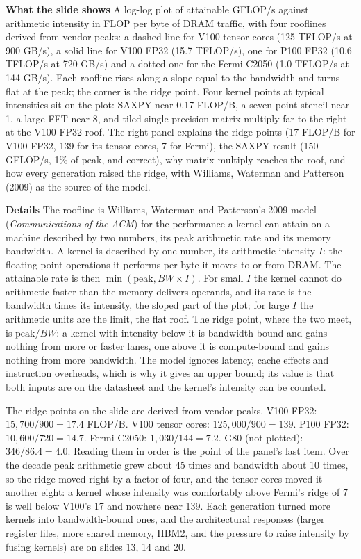 \documentclass[11pt,letterpaper]{article}
\newcommand{\para}[1]{\medskip\noindent\textbf{#1}\quad}
\begin{document}
\para{What the slide shows} A log-log plot of attainable GFLOP/s against arithmetic intensity in FLOP per byte of DRAM traffic, with four rooflines derived from vendor peaks: a dashed line for V100 tensor cores (125 TFLOP/s at 900 GB/s), a solid line for V100 FP32 (15.7 TFLOP/s), one for P100 FP32 (10.6 TFLOP/s at 720 GB/s) and a dotted one for the Fermi C2050 (1.0 TFLOP/s at 144 GB/s). Each roofline rises along a slope equal to the bandwidth and turns flat at the peak; the corner is the ridge point. Four kernel points at typical intensities sit on the plot: SAXPY near 0.17 FLOP/B, a seven-point stencil near 1, a large FFT near 8, and tiled single-precision matrix multiply far to the right at the V100 FP32 roof. The right panel explains the ridge points (17 FLOP/B for V100 FP32, 139 for its tensor cores, 7 for Fermi), the SAXPY result (150 GFLOP/s, 1\% of peak, and correct), why matrix multiply reaches the roof, and how every generation raised the ridge, with Williams, Waterman and Patterson (2009) as the source of the model.

\para{Details} The roofline is Williams, Waterman and Patterson's 2009 model (\emph{Communications of the ACM}) for the performance a kernel can attain on a machine described by two numbers, its peak arithmetic rate and its memory bandwidth. A kernel is described by one number, its arithmetic intensity $I$: the floating-point operations it performs per byte it moves to or from DRAM. The attainable rate is then $\min(\text{peak}, BW \times I)$. For small $I$ the kernel cannot do arithmetic faster than the memory delivers operands, and its rate is the bandwidth times its intensity, the sloped part of the plot; for large $I$ the arithmetic units are the limit, the flat roof. The ridge point, where the two meet, is $\text{peak}/BW$: a kernel with intensity below it is bandwidth-bound and gains nothing from more or faster lanes, one above it is compute-bound and gains nothing from more bandwidth. The model ignores latency, cache effects and instruction overheads, which is why it gives an upper bound; its value is that both inputs are on the datasheet and the kernel's intensity can be counted.

The ridge points on the slide are derived from vendor peaks. V100 FP32: $15{,}700/900 = 17.4$ FLOP/B. V100 tensor cores: $125{,}000/900 = 139$. P100 FP32: $10{,}600/720 = 14.7$. Fermi C2050: $1{,}030/144 = 7.2$. G80 (not plotted): $346/86.4 = 4.0$. Reading them in order is the point of the panel's last item. Over the decade peak arithmetic grew about 45 times and bandwidth about 10 times, so the ridge moved right by a factor of four, and the tensor cores moved it another eight: a kernel whose intensity was comfortably above Fermi's ridge of 7 is well below V100's 17 and nowhere near 139. Each generation turned more kernels into bandwidth-bound ones, and the architectural responses (larger register files, more shared memory, HBM2, and the pressure to raise intensity by fusing kernels) are on slides 13, 14 and 20.
\end{document}
